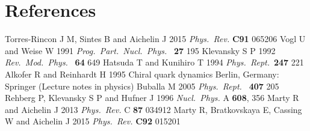 \documentclass[a4paper]{jpconf}
\begin{document}
\section*{References}
\medskip
\begin{enumerate}
 Torres-Rincon J M,  Sintes B  and Aichelin J 2015 {\it Phys.\ Rev. }  {\bf C91}  065206 
    Vogl U and Weise W 1991 {\it  Prog.\ Part.\ Nucl.\ Phys.\ } {\bf 27} 195 
     Klevansky S P 1992 {\it  Rev.\ Mod.\ Phys.} \  {\bf 64}  649 
  Hatsuda  T and Kunihiro T 1994  {\it Phys.\ Rept.}\  {\bf 247}  221 
   Alkofer R and Reinhardt H 1995 Chiral quark dynamics Berlin, Germany: Springer  (Lecture notes in physics)
   Buballa M 2005 {\it  Phys.\ Rept.\  } {\bf 407} 205 
  Rehberg P, Klevansky S P and Hufner J 1996 {\it   Nucl.\ Phys.} A {\bf 608}, 356 
   Marty R and Aichelin J 2013 {\it  Phys.\ Rev.} C {\bf 87}  034912 
   Marty R, Bratkovskaya E, Cassing W and Aichelin J 2015 {\it  Phys.\ Rev.}  {\bf C92} 015201 


\end{enumerate}
\smallskip
\end{document}

